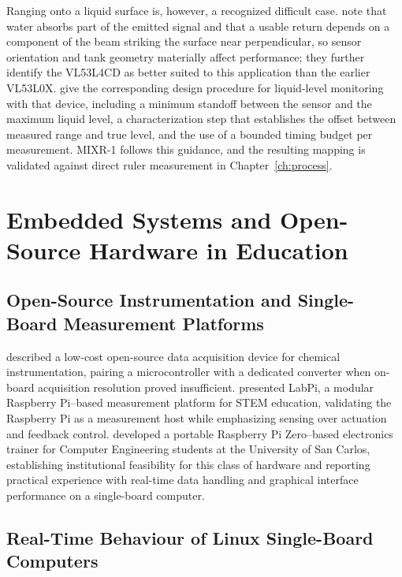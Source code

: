 Ranging onto a liquid surface is, however, a recognized difficult case. \citet{st2022tn1450} note that water absorbs part of the emitted signal and that a usable return depends on a component of the beam striking the surface near perpendicular, so sensor orientation and tank geometry materially affect performance; they further identify the VL53L4CD as better suited to this application than the earlier VL53L0X. \citet{st2022an5851} give the corresponding design procedure for liquid-level monitoring with that device, including a minimum standoff between the sensor and the maximum liquid level, a characterization step that establishes the offset between measured range and true level, and the use of a bounded timing budget per measurement. MIXR-1 follows this guidance, and the resulting mapping is validated against direct ruler measurement in Chapter~\ref{ch:process}.


\section{Embedded Systems and Open-Source Hardware in Education}
\label{sec:rrl-embedded}

\subsection{Open-Source Instrumentation and Single-Board Measurement Platforms}
\label{subsec:rrl-opensource}

\citet{grinias2016} described a low-cost open-source data acquisition device for chemical instrumentation, pairing a microcontroller with a dedicated converter when on-board acquisition resolution proved insufficient. \citet{wejner2022} presented LabPi, a modular Raspberry Pi--based measurement platform for STEM education, validating the Raspberry Pi as a measurement host while emphasizing sensing over actuation and feedback control. \citet{benatiro2023} developed a portable Raspberry Pi Zero--based electronics trainer for Computer Engineering students at the University of San Carlos, establishing institutional feasibility for this class of hardware and reporting practical experience with real-time data handling and graphical interface performance on a single-board computer.

\subsection{Real-Time Behaviour of Linux Single-Board Computers}
\label{subsec:rrl-realtime}

